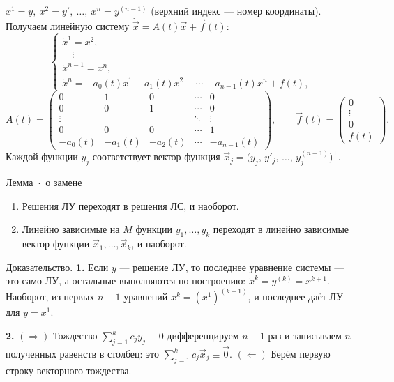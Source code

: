 \documentclass[12pt,a4paper]{article}
\newcommand{\vect}[1]{\vec{#1}}
\begin{document}
\(x^1=y,\ x^2=y',\ \ldots,\ x^n=y^{(n-1)}\) (верхний индекс --- номер координаты). Получаем линейную систему \(\dot{\vect{x}}=A(t)\vect{x}+\vect{f}(t)\):
\[
 \begin{cases}
 \dot x^1=x^2,\\
 \quad\vdots\\
 \dot x^{n-1}=x^n,\\
 \dot x^n=-a_0(t)x^1-a_1(t)x^2-\cdots-a_{n-1}(t)x^n+f(t),
 \end{cases}
\]
\[
 A(t)=\begin{pmatrix}
 0&1&0&\cdots&0\\
 0&0&1&\cdots&0\\
 \vdots&&&\ddots&\vdots\\
 0&0&0&\cdots&1\\
 -a_0(t)&-a_1(t)&-a_2(t)&\cdots&-a_{n-1}(t)
 \end{pmatrix},\qquad
 \vect{f}(t)=\begin{pmatrix}0\\ \vdots\\ 0\\ f(t)\end{pmatrix}.
\]
Каждой функции \(y_j\) соответствует вектор-функция \(\vect{x}_j=\bigl(y_j,\,y'_j,\,\ldots,\,y_j^{(n-1)}\bigr)^{\mathsf T}\).

\begin{lemma}{Лемма~\(\cdot\)~о замене}
\begin{enumerate}
\item Решения ЛУ переходят в решения ЛС, и наоборот.
\item Линейно зависимые на \(M\) функции \(y_1,\ldots,y_k\) переходят в линейно зависимые вектор-функции \(\vect{x}_1,\ldots,\vect{x}_k\), и наоборот.
\end{enumerate}
\end{lemma}

\begin{reasoning}{Доказательство.}
\textbf{1.} Если \(y\) --- решение ЛУ, то последнее уравнение системы --- это само ЛУ, а остальные выполняются по построению: \(\dot x^k=y^{(k)}=x^{k+1}\). Наоборот, из первых \(n-1\) уравнений \(x^k=(x^1)^{(k-1)}\), и последнее даёт ЛУ для \(y=x^1\).

\textbf{2.} \((\Rightarrow)\) Тождество \(\sum_{j=1}^k c_j y_j\equiv0\) дифференцируем \(n-1\) раз и записываем \(n\) полученных равенств в столбец: это \(\sum_{j=1}^k c_j\vect{x}_j\equiv\vect{0}\). \((\Leftarrow)\) Берём первую строку векторного тождества.
\end{reasoning}
\end{document}
